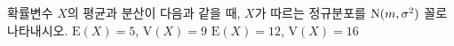 확률변수 $X$의 평균과 분산이 다음과 같을 때, $X$가 따르는 정규분포를 $\mathrm{N}(m{,}\mkern3mu\mathopen{}\sigma^2)$ 꼴로 나타내시오.
 $\mathrm{E}(X)=5$, $\mathrm{V}(X)=9$
 $\mathrm{E}(X)=12$, $\mathrm{V}(X)=16$
